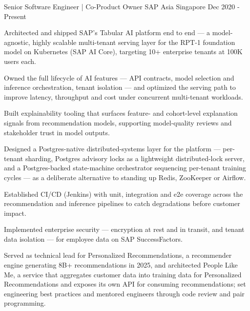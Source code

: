 

\begin{cventries}

  \cventry
    {Senior Software Engineer | Co-Product Owner} %
    {SAP Asia} %
    {Singapore} %
    {Dec 2020 - Present} %
    {
      \begin{cvitems} %
        \item {Architected and shipped SAP's Tabular AI platform end to end --- a model-agnostic, highly scalable multi-tenant serving layer for the RPT-1 foundation model on Kubernetes (SAP AI Core), targeting 10+ enterprise tenants at 100K users each.}
        \item {Owned the full lifecycle of AI features --- API contracts, model selection and inference orchestration, tenant isolation --- and optimized the serving path to improve latency, throughput and cost under concurrent multi-tenant workloads.}
        \item {Built explainability tooling that surfaces feature- and cohort-level explanation signals from recommendation models, supporting model-quality reviews and stakeholder trust in model outputs.}
        \item {Designed a Postgres-native distributed-systems layer for the platform --- per-tenant sharding, Postgres advisory locks as a lightweight distributed-lock server, and a Postgres-backed state-machine orchestrator sequencing per-tenant training cycles --- as a deliberate alternative to standing up Redis, ZooKeeper or Airflow.}
        \item {Established CI/CD (Jenkins) with unit, integration and e2e coverage across the recommendation and inference pipelines to catch degradations before customer impact.}
        \item {Implemented enterprise security --- encryption at rest and in transit, and tenant data isolation --- for employee data on SAP SuccessFactors.}
        \item {Served as technical lead for Personalized Recommendations, a recommender engine generating 8B+ recommendations in 2025, and architected People Like Me, a service that aggregates customer data into training data for Personalized Recommendations and exposes its own API for consuming recommendations; set engineering best practices and mentored engineers through code review and pair programming.}
      \end{cvitems}
    }


\end{cventries}
